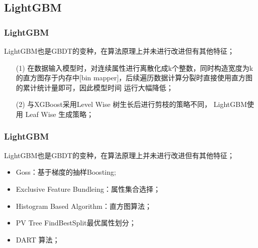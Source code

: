 \documentclass[usenames,dvipsnames]{beamer}
\begin{document}
\subsection{LightGBM}
\begin{frame}
\frametitle{LightGBM}
LightGBM也是GBDT的变种，在算法原理上并未进行改进但有其他特征；
\begin{itemize}
  \item[(1)] 在数据输入模型时，对连续属性进行离散化成k个整数，同时构造宽度为k的直方图存于内存中[bin mapper]，后续遍历数据计算分裂时直接使用直方图的累计统计量即可，因此模型时间     运行大幅降低；
  \item[(2)] 与XGBoost采用Level Wise 树生长后进行剪枝的策略不同， LightGBM使用 Leaf Wise 生成策略；
\end{itemize}
\end{frame}
\begin{frame}
\frametitle{LightGBM}
LightGBM也是GBDT的变种，在算法原理上并未进行改进但有其他特征；
\begin{itemize}
  \item Goss：基于梯度的抽样Boosting;
  \item Exclusive Feature Bundleing：属性集合选择；
  \item Histogram Based Algorithm：直方图算法；
  \item PV Tree FindBestSplit最优属性划分；
  \item DART 算法；
\end{itemize}
\end{frame}
\end{document}
